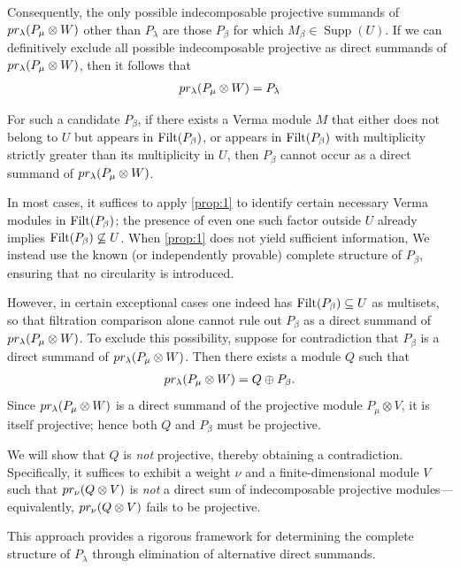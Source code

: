 Consequently, the only possible indecomposable projective summands of $pr_{\lambda}(P_\mu \otimes W)$ other than $P_\lambda$ are those $P_\beta$ for which $M_\beta \in \operatorname{Supp}(U)$. If we can definitively exclude all possible indecomposable projective as direct summands of $pr_{\lambda}(P_\mu \otimes W)$, then it follows that
\begin{equation}\notag
  \begin{aligned}
    pr_{\lambda}(P_\mu \otimes W) = P_\lambda
  \end{aligned}
\end{equation}

For such a candidate $P_\beta$, if there exists a Verma module $M$ that either does not belong to $U$ but appears in $\operatorname{Filt}(P_\beta)$, or appears in $\operatorname{Filt}(P_\beta)$ with multiplicity strictly greater than its multiplicity in $U$, then $P_\beta$ cannot occur as a direct summand of $pr_{\lambda}(P_\mu \otimes W)$.

In most cases, it suffices to apply \cref{prop:1} to identify certain necessary Verma modules in $\operatorname{Filt}(P_\beta)$; the presence of even one such factor outside $U$ already implies $\operatorname{Filt}(P_\beta) \not\subseteq U$.
When \cref{prop:1} does not yield sufficient information, We instead use the known (or independently provable) complete structure of $P_\beta$, ensuring that no circularity is introduced.

However, in certain exceptional cases one indeed has $\operatorname{Filt}(P_\beta) \subseteq U$ as multisets, so that filtration comparison alone cannot rule out $P_\beta$ as a direct summand of $pr_\lambda(P_\mu \otimes W)$.
To exclude this possibility, suppose for contradiction that $P_\beta$ is a direct summand of $pr_{\lambda}(P_\mu \otimes W)$. Then there exists a module $Q$ such that
\begin{equation}\notag
  \begin{aligned}
    pr_{\lambda}(P_\mu \otimes W) = Q \oplus P_\beta.
  \end{aligned}
\end{equation}
Since $pr_{\lambda}(P_\mu \otimes W)$ is a direct summand of the projective module $P_\mu \otimes V$, it is itself projective; hence both $Q$ and $P_\beta$ must be projective.

We will show that $Q$ is \emph{not} projective, thereby obtaining a contradiction. Specifically, it suffices to exhibit a weight $\nu$ and a finite-dimensional module $V$ such that $pr_\nu(Q \otimes V)$ is \emph{not} a direct sum of indecomposable projective modules—equivalently, $pr_\nu(Q \otimes V)$ fails to be projective.

This approach provides a rigorous framework for determining the complete structure of $P_\lambda$ through elimination of alternative direct summands.

